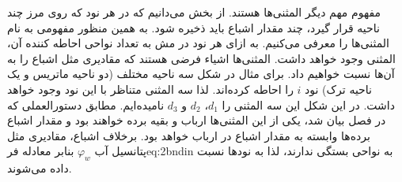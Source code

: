 مفهوم مهم دیگر المثنی‌ها هستند. از بخش  می‌دانیم که در هر نود که روی مرز چند ناحیه قرار گیرد، چند مقدار اشباع باید ذخیره شود. به همین منظور مفهومی به نام المثنی‌ها را معرفی می‌کنیم. به ازای هر نود در مش به تعداد نواحی احاطه کننده آن، المثنی وجود خواهد داشت. المثنی‌ها اشیاء فرضی هستند که مقادیری مثل اشباع را به آن‌ها نسبت خواهیم داد. برای مثال در شکل  سه ناحیه مختلف (دو ناحیه ماتریس و یک ناحیه ترک) نود $i$ را احاطه کرده‌اند. لذا سه المثنی متناظر با این نود وجود خواهد داشت. در این شکل این سه المثنی را
$d_1$، $d_2$ و $d_3$
نامیده‌ایم. مطابق دستورالعملی که در فصل  بیان شد، یکی از این المثنی‌ها ارباب و بقیه برده‌ خواهند بود و مقدار اشباع برده‌ها وابسته به مقدار اشباع در ارباب خواهد بود. برخلاف اشباع، مقادیری مثل پتانسیل آب $\varphi_w$ بنابر معادله ‌فر{eq:2bndin} به نواحی بستگی ندارند، لذا به نود‌ها نسبت داده ‌می‌شوند.


